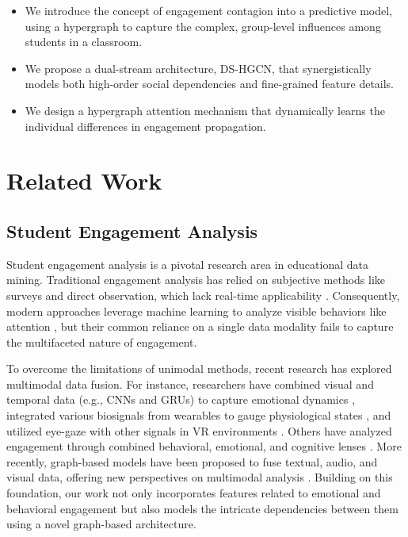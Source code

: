 \documentclass[runningheads]{llncs}
\begin{document}
\begin{itemize}
	\item[$\bullet$] We introduce the concept of engagement contagion into a predictive model, using a hypergraph to capture the complex, group-level influences among students in a classroom.
	\item[$\bullet$] We propose a dual-stream architecture, DS-HGCN, that synergistically models both high-order social dependencies and fine-grained feature details.
	\item[$\bullet$] We design a hypergraph attention mechanism that dynamically learns the individual differences in engagement propagation.
\end{itemize}


\section{Related Work}

\subsection{Student Engagement Analysis}
Student engagement analysis is a pivotal research area in educational data mining. Traditional engagement analysis has relied on subjective methods like surveys and direct observation, which lack real-time applicability \cite{azevedo2015defining,vallerand1992academic,pekrun2011measuring}. Consequently, modern approaches leverage machine learning to analyze visible behaviors like attention \cite{kodithuwakku2022emotion,gupta2023facial,khenkar2022engagement,ngoc2019computer}, but their common reliance on a single data modality fails to capture the multifaceted nature of engagement.


To overcome the limitations of unimodal methods, recent research has explored multimodal data fusion. For instance, researchers have combined visual and temporal data (e.g., CNNs and GRUs) to capture emotional dynamics \cite{ding2023online}, integrated various biosignals from wearables to gauge physiological states \cite{sodergaard2023inferring}, and utilized eye-gaze with other signals in VR environments \cite{asish2022detecting}. Others have analyzed engagement through combined behavioral, emotional, and cognitive lenses \cite{vanneste2021computer}. More recently, graph-based models have been proposed to fuse textual, audio, and visual data, offering new perspectives on multimodal analysis \cite{li2024multimodal}. Building on this foundation, our work not only incorporates features related to emotional and behavioral engagement but also models the intricate dependencies between them using a novel graph-based architecture.
\end{document}
